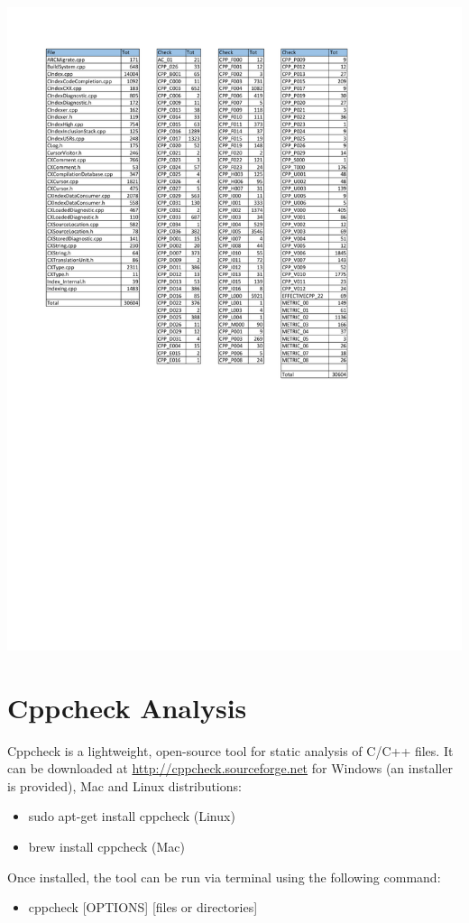 \begin{minipage}{\linewidth}
	\includegraphics[width=\textwidth]{pdf/AllChecks_Summary.pdf}
\end{minipage}

\section{Cppcheck Analysis}

Cppcheck is a lightweight, open-source tool for static analysis of C/C++ files. It can be downloaded at \url{http://cppcheck.sourceforge.net} for Windows (an installer is provided), Mac and Linux distributions:
\begin{itemize}
	\item sudo apt-get install cppcheck (Linux)
	\item brew install cppcheck (Mac)
\end{itemize}
Once installed, the tool can be run via terminal using the following command:
\begin{itemize}
	\item cppcheck [OPTIONS] [files or directories]
\end{itemize}

